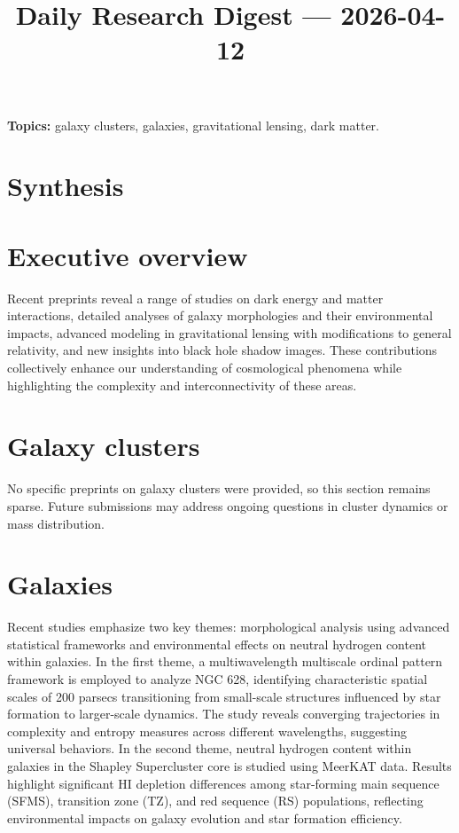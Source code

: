 \documentclass[11pt]{article}
\begin{document}
\title{Daily Research Digest --- 2026-04-12}
\author{}
\date{}
\maketitle
\textbf{Topics:} galaxy clusters, galaxies, gravitational lensing, dark matter.
\section*{Synthesis}
\section*{Executive overview}
Recent preprints reveal a range of studies on dark energy and matter interactions, detailed analyses of galaxy morphologies and their environmental impacts, advanced modeling in gravitational lensing with modifications to general relativity, and new insights into black hole shadow images. These contributions collectively enhance our understanding of cosmological phenomena while highlighting the complexity and interconnectivity of these areas.
\section*{Galaxy clusters}
No specific preprints on galaxy clusters were provided, so this section remains sparse. Future submissions may address ongoing questions in cluster dynamics or mass distribution.
\section*{Galaxies}
Recent studies emphasize two key themes: morphological analysis using advanced statistical frameworks and environmental effects on neutral hydrogen content within galaxies. In the first theme, a multiwavelength multiscale ordinal pattern framework is employed to analyze NGC 628, identifying characteristic spatial scales of 200 parsecs transitioning from small-scale structures influenced by star formation to larger-scale dynamics. The study reveals converging trajectories in complexity and entropy measures across different wavelengths, suggesting universal behaviors.
In the second theme, neutral hydrogen content within galaxies in the Shapley Supercluster core is studied using MeerKAT data. Results highlight significant HI depletion differences among star-forming main sequence (SFMS), transition zone (TZ), and red sequence (RS) populations, reflecting environmental impacts on galaxy evolution and star formation efficiency.
\end{document}
